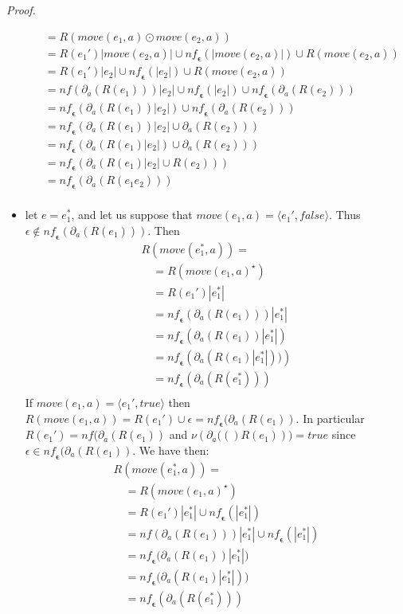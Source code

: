 \documentclass[preprint]{sigplanconf}
\newcommand{\true}{\mathit{true}}
\newcommand{\false}{\mathit{false}}
\newcommand{\varoast}{\star}
\newcommand{\der}[2]{\ensuremath{\partial_{#1}(#2)}}
\newcommand{\nul}[1]{\ensuremath{\nu(#1)}}
\newcommand{\dnf}{\mathit{nf}}
\newcommand{\nf}{\mathit{nf}_{\!\mathbf{\epsilon}}}
\newcounter{item}
\newenvironment{proof}{\begin{trivlist}\item[]{\em Proof.}}{\end{trivlist}}
\begin{document}
\begin{proof}
\begin{itemize}
\[\begin{array}{l}
\quad= R(move(e_1,a) \odot move(e_2,a))\\
\quad= R(e_1')|move(e_2,a)| \cup \nf(|move(e_2,a)|) \cup R(move(e_2,a))\\
\quad= R(e_1')|e_2| \cup \nf(|e_2|) \cup R(move(e_2,a))\\
\quad= \dnf(\der{a}{R(e_1)})|e_2| \cup \nf(|e_2|) \cup \nf(\der{a}{R(e_2)})\\ 
\quad= \nf(\der{a}{R(e_1)}|e_2|) \cup \nf(\der{a}{R(e_2)})\\ 
\quad= \nf(\der{a}{R(e_1)}|e_2| \cup \der{a}{R(e_2)})\\ 
\quad= \nf(\der{a}{R(e_1)|e_2|} \cup \der{a}{R(e_2)})\\
\quad= \nf(\der{a}{R(e_1)|e_2| \cup R(e_2)})\\
\quad= \nf(\der{a}{R(e_1e_2)})\\
\end{array}
\]
\item let $e=e_1^*$, and let us suppose that $move(e_1,a) =
\langle e_1', \false \rangle$. Thus $\epsilon \not \in \nf(\der{a}{R(e_1)})$.
Then
\[
\begin{array}{l}
R(move(e_1^*,a)) =\\
\quad = R(move(e_1,a)^\varoast) \\
\quad= R(e_1')|e_1^*|\\
\quad= \nf(\der{a}{R(e_1)})|e_1^*| \\
\quad= \nf(\der{a}{R(e_1)}|e_1^*|) \\
\quad= \nf(\der{a}{R(e_1)|e_1^*|)})\\
\quad= \nf(\der{a}{R(e_1^*)})\\
\end{array}
\]
If $move(e_1,a) = \langle e_1', \true \rangle$ then
$R(move(e_1,a)) = R(e_1') \cup {\epsilon} = \nf(\der{a}{R(e_1)}$.
In particular
$R(e_1') = \dnf(\der{a}{R(e_1)}$ and $\nul{\der{a}(R(e_1))} = \true$ since
$\epsilon \in \nf(\der{a}{R(e_1)}$.
We have then:
\[
\begin{array}{l}
R(move(e_1^*,a)) =\\
\quad = R(move(e_1,a)^\varoast) \\
\quad= R(e_1')|e_1^*| \cup \nf(|e_1^*|)\\
\quad= \dnf(\der{a}{R(e_1)})|e_1^*| \cup \nf(|e_1^*|)\\
\quad= \nf(\der{a}{R(e_1))|e_1^*|}\\
\quad= \nf(\der{a}{R(e_1)|e_1^*|)}\\
\quad= \nf(\der{a}{R(e_1^*)})\\
\end{array}
\]
\end{itemize}
\end{proof}
\end{document}
